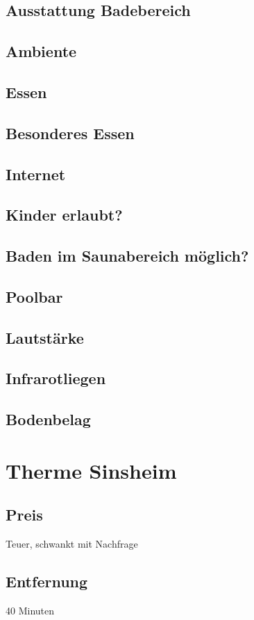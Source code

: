 \documentclass{article}
\begin{document}
\subsection*{Ausstattung Badebereich}
\subsection*{Ambiente}
\subsection*{Essen}
\subsection*{Besonderes Essen}
\subsection*{Internet}
\subsection*{Kinder erlaubt?}
\subsection*{Baden im Saunabereich möglich?}
\subsection*{Poolbar}
\subsection*{Lautstärke}
\subsection*{Infrarotliegen}
\subsection*{Bodenbelag}

\section*{Therme Sinsheim}
\subsection*{Preis} Teuer, schwankt mit Nachfrage
\subsection*{Entfernung} 40 Minuten
\end{document}
